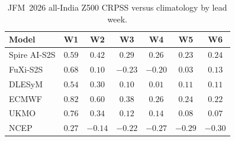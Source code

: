 \begin{table}[t]
  \centering
  \caption{JFM~2026 all-India Z500 CRPSS versus climatology by lead week.}
  \label{tab:jfm_crpss_z500}
  \small
  \begin{tabular}{lcccccc}
    \toprule
    Model & W1 & W2 & W3 & W4 & W5 & W6 \\
    \midrule
    Spire AI-S2S   & $0.59$ & $0.42$ & $0.29$ & $0.26$ & $0.23$ & $\mathbf{0.24}$ \\
FuXi-S2S       & $0.68$ & $0.10$ & $-0.23$ & $-0.20$ & $0.03$ & $0.13$ \\
DLESyM         & $0.54$ & $0.30$ & $0.10$ & $0.01$ & $0.11$ & $0.11$ \\
ECMWF          & $\mathbf{0.82}$ & $\mathbf{0.60}$ & $\mathbf{0.38}$ & $\mathbf{0.26}$ & $\mathbf{0.24}$ & $0.22$ \\
UKMO           & $0.76$ & $0.34$ & $0.12$ & $0.14$ & $0.08$ & $0.07$ \\
NCEP           & $0.27$ & $-0.14$ & $-0.22$ & $-0.27$ & $-0.29$ & $-0.30$ \\
    \bottomrule
  \end{tabular}
\end{table}
